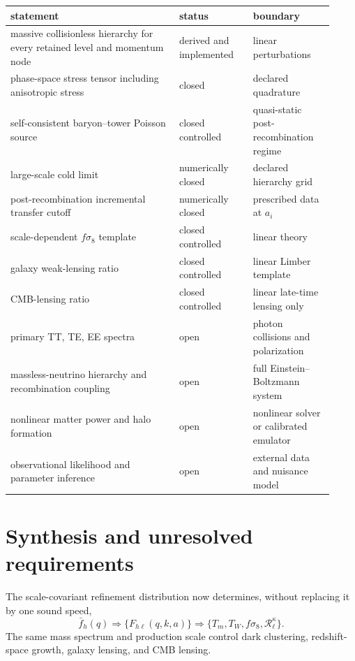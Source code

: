 \begin{center}
\begin{tabular}{>{\raggedright\arraybackslash}p{0.48\linewidth}>{\raggedright\arraybackslash}p{0.21\linewidth}>{\raggedright\arraybackslash}p{0.23\linewidth}}
\toprule
statement & status & boundary\\
\midrule
massive collisionless hierarchy for every retained level and momentum node & derived and implemented & linear perturbations\\
phase-space stress tensor including anisotropic stress & closed & declared quadrature\\
self-consistent baryon--tower Poisson source & closed controlled & quasi-static post-recombination regime\\
large-scale cold limit & numerically closed & declared hierarchy grid\\
post-recombination incremental transfer cutoff & numerically closed & prescribed data at $a_i$\\
scale-dependent $f\sigma_8$ template & closed controlled & linear theory\\
galaxy weak-lensing ratio & closed controlled & linear Limber template\\
CMB-lensing ratio & closed controlled & linear late-time lensing only\\
primary TT, TE, EE spectra & open & photon collisions and polarization\\
massless-neutrino hierarchy and recombination coupling & open & full Einstein--Boltzmann system\\
nonlinear matter power and halo formation & open & nonlinear solver or calibrated emulator\\
observational likelihood and parameter inference & open & external data and nuisance model\\
\bottomrule
\end{tabular}
\end{center}

\section{Synthesis and unresolved requirements}

The scale-covariant refinement distribution now determines, without replacing it by one sound speed,
\begin{equation}
 \boxed{
 \bar f_h(q)
 \Longrightarrow
 \{F_{h\ell}(q,k,a)\}
 \Longrightarrow
 \{T_m,T_W,f\sigma_8,\mathcal R_\ell^\kappa\}.}
 \label{eq:cb-result-chain}
\end{equation}
The same mass spectrum and production scale control dark clustering, redshift-space growth, galaxy lensing, and CMB lensing.

